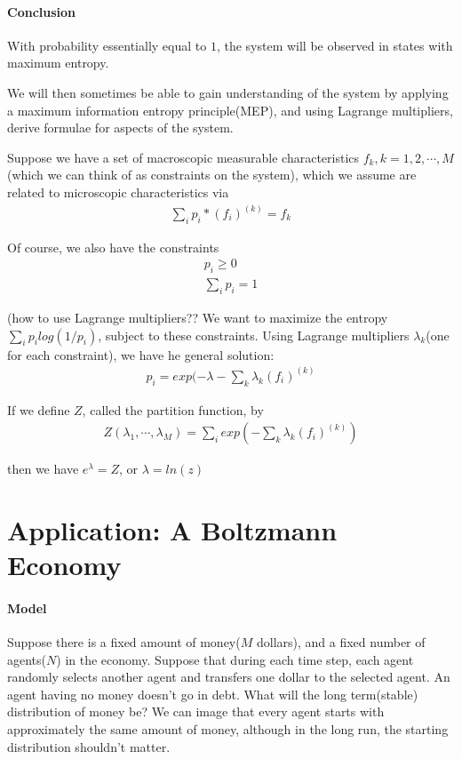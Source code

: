 \documentclass[10 pt,final]{article}
\newcommand{\impo}[1]{{\color{magenta} #1}}
\newcommand{\question}[1]{{\color{blue} #1}}
\begin{document}
\paragraph{Conclusion} With probability essentially equal to $1$, the system will be observed in states with maximum entropy.

We will then sometimes be able to gain understanding of the system by applying a \impo{maximum information entropy principle(MEP)}, and using Lagrange multipliers, derive formulae for aspects of the system.

Suppose we have a set of macroscopic measurable characteristics $f_k, k=1,2, \cdots, M$(which we can think of as constraints on the system), which we assume are related to microscopic characteristics via
\begin{align*}
\sum_i p_i *(f_i)^{(k)} = f_k
\end{align*}

Of course, we also have the constraints
\begin{align*}
p_i \geq 0 \\
\sum_i p_i = 1
\end{align*}

\question{(how to use Lagrange multipliers??}
We want to maximize the entropy $\sum_i p_ilog(1/p_i)$, subject to these constraints. Using \impo{Lagrange multipliers} $\lambda_k$(one for each constraint), we have he general solution:
\begin{align*}
p_i = exp(-\lambda - \sum_k \lambda_k (f_i)^{(k)}
\end{align*}

If we define $Z$, called the partition function, by
\begin{align*}
Z(\lambda_1, \cdots, \lambda_M) = \sum_i exp(-\sum_k \lambda_k (f_i)^{(k)})
\end{align*}

then we have $e^\lambda = Z$, or $\lambda = ln(z)$
\section{Application: A Boltzmann Economy}
\paragraph{Model} Suppose there is a fixed amount of money($M$ dollars), and a fixed number of agents($N$) in the economy. Suppose that during each time step, each agent randomly selects another agent and transfers one dollar to the selected agent. An agent having no money doesn't go in debt. What will the long term(stable) distribution of money be? We can image that every agent starts with approximately the same amount of money, although in the long run, the starting distribution shouldn't matter.
\end{document}
